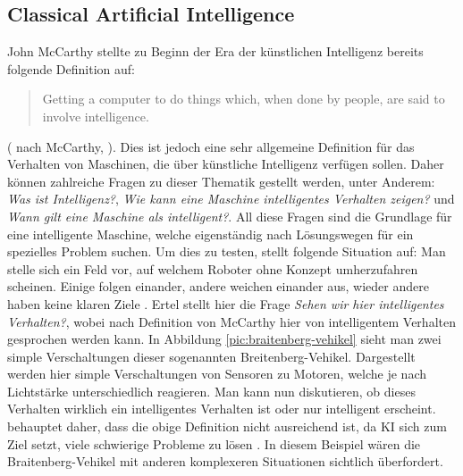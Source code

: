         \subsection{Classical Artificial Intelligence}\label{subsec:cai}
            John McCarthy stellte zu Beginn der Era der künstlichen Intelligenz bereits folgende Definition
            auf:
            \begin{quote}
                Getting a computer to do things which, when done by people, are said to involve intelligence.
            \end{quote}
            (\citeauthor{ertel2016grundkurs} nach McCarthy, \citeyear{ertel2016grundkurs}). Dies ist jedoch eine sehr
            allgemeine Definition für das Verhalten von Maschinen, die über künstliche Intelligenz verfügen sollen.
            Daher können zahlreiche Fragen zu dieser Thematik gestellt werden, unter Anderem: \textit{Was ist Intelligenz?},
            \textit{Wie kann eine Maschine intelligentes Verhalten zeigen?} und \textit{Wann gilt eine Maschine als intelligent?}.
            All diese Fragen sind die Grundlage für eine intelligente Maschine, welche eigenständig nach Lösungswegen
            für ein spezielles Problem suchen. Um dies zu testen, stellt \citeauthor{ertel2016grundkurs} folgende Situation
            auf: Man stelle sich ein Feld vor, auf welchem Roboter ohne Konzept umherzufahren scheinen. Einige folgen einander,
            andere weichen einander aus, wieder andere haben keine klaren Ziele \cite[s. 2]{ertel2016grundkurs}.
            Ertel stellt hier die Frage \textit{Sehen wir hier intelligentes Verhalten?}, wobei nach Definition von
            McCarthy hier von intelligentem Verhalten gesprochen werden kann. In Abbildung \ref{pic:braitenberg-vehikel}
            sieht man zwei simple Verschaltungen dieser sogenannten Breitenberg-Vehikel. Dargestellt werden hier simple
            Verschaltungen von Sensoren zu Motoren, welche je nach Lichtstärke unterschiedlich reagieren.
            Man kann nun diskutieren, ob dieses Verhalten wirklich ein intelligentes Verhalten ist oder
            nur intelligent erscheint. \citeauthor{ertel2016grundkurs} behauptet daher, dass die obige Definition nicht
            ausreichend ist, da KI sich zum Ziel setzt, viele schwierige Probleme zu lösen \citeyearpar{ertel2016grundkurs}.
            In diesem Beispiel wären die Braitenberg-Vehikel mit anderen komplexeren Situationen sichtlich überfordert.


